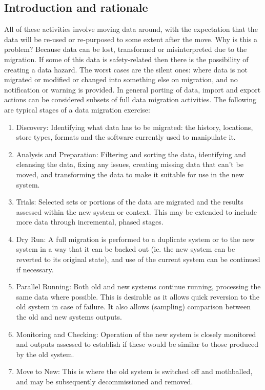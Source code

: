 \subsection{Introduction and rationale}\label{bkm:migrationintro}
All of these activities involve moving data around, with the expectation that the data will be re-used or re-purposed to some extent after the move. Why is this a problem? Because data can be lost, transformed or misinterpreted due to the migration. If some of this data is safety-related then there is the possibility of creating a data \gls{hazard}. The worst cases are the silent ones: where data is not migrated or modified or changed into something else on migration, and no notification or warning is provided.
In general porting of data, import and export actions can be considered subsets of full data migration activities. 
The following are typical stages of a data migration exercise:
\begin{enumerate}[label=\color{dsiwgAccentColour}\roman*)]
\item Discovery: Identifying what data has to be migrated:
the history, locations, store types, formats and the software currently used to manipulate it.
\item Analysis and Preparation:
Filtering and sorting the data, identifying and cleansing the data, fixing any issues, creating missing data that can’t be moved,
and transforming the data to make it suitable for use in the new system.
\item Trials:
Selected sets or portions of the data are migrated and the results assessed within the new system or context.
This may be extended to include more data through incremental, phased stages.
\item Dry Run:
A full migration is performed to a duplicate system or to the new system in a way that it can be backed out
(ie. the new system can be reverted to its original state), and use of the current system can be continued if necessary.
\item Parallel Running:
Both old and new systems continue running, processing the same data where possible.
This is desirable as it allows quick reversion to the old system in case of failure.
It also allows (sampling) comparison between the old and new systems outputs.
\item Monitoring and Checking:
Operation of the new system is closely monitored and outputs assessed to establish if these would be similar to those produced
by the old system.
\item Move to New:
This is where the old system is switched off and mothballed, and may be subsequently decommissioned and removed.
\end{enumerate}

